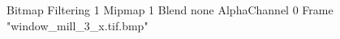 {Bitmap
	{Filtering 1}
	{Mipmap 1}
	{Blend none}
	{AlphaChannel 0}
	{Frame "window_mill_3_x.tif.bmp"}
}
